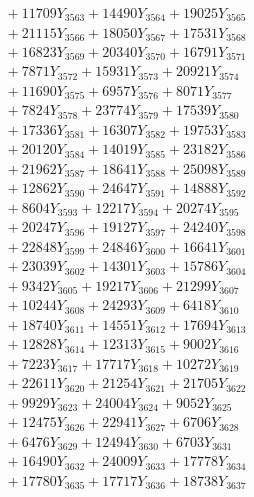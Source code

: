 \documentclass[a4paper,10pt]{article}
\begin{document}
{\begin{align}
&\;  + 11709 Y_{3563} + 14490 Y_{3564} + 19025 Y_{3565} \\[0.3ex]
&\;  + 21115 Y_{3566} + 18050 Y_{3567} + 17531 Y_{3568} \\[0.5ex]\allowbreak
&\;  + 16823 Y_{3569} + 20340 Y_{3570} + 16791 Y_{3571} \\[0.3ex]
&\;  + 7871 Y_{3572} + 15931 Y_{3573} + 20921 Y_{3574} \\[0.3ex]
&\;  + 11690 Y_{3575} + 6957 Y_{3576} + 8071 Y_{3577} \\[0.3ex]
&\;  + 7824 Y_{3578} + 23774 Y_{3579} + 17539 Y_{3580} \\[0.3ex]
&\;  + 17336 Y_{3581} + 16307 Y_{3582} + 19753 Y_{3583} \\[0.3ex]
&\;  + 20120 Y_{3584} + 14019 Y_{3585} + 23182 Y_{3586} \\[0.3ex]
&\;  + 21962 Y_{3587} + 18641 Y_{3588} + 25098 Y_{3589} \\[0.3ex]
&\;  + 12862 Y_{3590} + 24647 Y_{3591} + 14888 Y_{3592} \\[0.3ex]
&\;  + 8604 Y_{3593} + 12217 Y_{3594} + 20274 Y_{3595} \\[0.3ex]
&\;  + 20247 Y_{3596} + 19127 Y_{3597} + 24240 Y_{3598} \\[0.5ex]\allowbreak
&\;  + 22848 Y_{3599} + 24846 Y_{3600} + 16641 Y_{3601} \\[0.3ex]
&\;  + 23039 Y_{3602} + 14301 Y_{3603} + 15786 Y_{3604} \\[0.3ex]
&\;  + 9342 Y_{3605} + 19217 Y_{3606} + 21299 Y_{3607} \\[0.3ex]
&\;  + 10244 Y_{3608} + 24293 Y_{3609} + 6418 Y_{3610} \\[0.3ex]
&\;  + 18740 Y_{3611} + 14551 Y_{3612} + 17694 Y_{3613} \\[0.3ex]
&\;  + 12828 Y_{3614} + 12313 Y_{3615} + 9002 Y_{3616} \\[0.3ex]
&\;  + 7223 Y_{3617} + 17717 Y_{3618} + 10272 Y_{3619} \\[0.3ex]
&\;  + 22611 Y_{3620} + 21254 Y_{3621} + 21705 Y_{3622} \\[0.3ex]
&\;  + 9929 Y_{3623} + 24004 Y_{3624} + 9052 Y_{3625} \\[0.3ex]
&\;  + 12475 Y_{3626} + 22941 Y_{3627} + 6706 Y_{3628} \\[0.5ex]\allowbreak
&\;  + 6476 Y_{3629} + 12494 Y_{3630} + 6703 Y_{3631} \\[0.3ex]
&\;  + 16490 Y_{3632} + 24009 Y_{3633} + 17778 Y_{3634} \\[0.3ex]
&\;  + 17780 Y_{3635} + 17717 Y_{3636} + 18738 Y_{3637} \\[0.3ex]

\end{align}}
\end{document}
